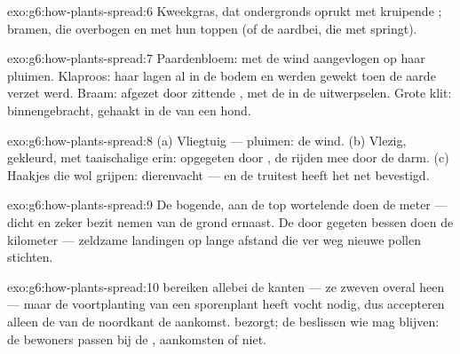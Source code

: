 \begin{solution}{exo:g6:how-plants-spread:6}
Kweekgras, dat ondergronds oprukt met kruipende ; bramen, die
overbogen en met hun toppen  (of de aardbei, die met 
springt).
\end{solution}

\begin{solution}{exo:g6:how-plants-spread:7}
Paardenbloem: met de wind aangevlogen op haar pluimen. Klaproos: haar
 lagen al in de bodem en werden gewekt toen de aarde verzet werd.
Braam: afgezet door zittende , met de  in de uitwerpselen.
Grote klit: binnengebracht, gehaakt in de  van een hond.
\end{solution}

\begin{solution}{exo:g6:how-plants-spread:8}
(a) Vliegtuig --- pluimen: de wind. (b) Vlezig, gekleurd, met
taaischalige  erin: opgegeten door , de  rijden mee door
de darm. (c) Haakjes die wol grijpen: dierenvacht --- en de truitest
heeft het net bevestigd.
\end{solution}

\begin{solution}{exo:g6:how-plants-spread:9}
De bogende, aan de top wortelende  doen de meter --- dicht en
zeker bezit nemen van de grond ernaast. De door  gegeten bessen
doen de kilometer --- zeldzame landingen op lange afstand die ver weg
nieuwe pollen stichten.
\end{solution}

\begin{solution}{exo:g6:how-plants-spread:10}
 bereiken allebei de kanten --- ze zweven overal heen --- maar de
voortplanting van een sporenplant heeft vocht nodig, dus accepteren
alleen de  van de noordkant de aankomst. 
bezorgt; de  beslissen wie mag blijven: de bewoners passen
bij de , aankomsten of niet.
\end{solution}

